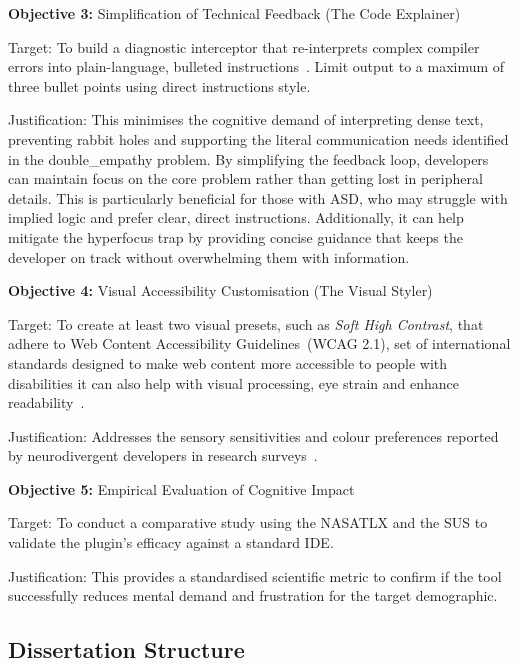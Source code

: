 \textbf{Objective 3:} Simplification of Technical Feedback (The Code Explainer)

Target: To build a diagnostic interceptor that re-interprets complex compiler errors into plain-language, bulleted instructions~\cite{rocha2025conceptual}. Limit output to a maximum of three bullet points using direct instructions style.


Justification: This minimises the cognitive demand of interpreting dense text, preventing rabbit holes and supporting the literal communication needs identified in the \Gls{double_empathy}
 problem. By simplifying the feedback loop, developers can maintain focus on the core problem rather than getting lost in peripheral details. This is particularly beneficial for those with \gls{ASD},
  who may struggle with implied logic and prefer clear, direct instructions. Additionally, it can help mitigate the \gls{hyperfocus} trap by providing concise guidance that keeps the developer on track 
  without overwhelming them with information.

\textbf{Objective 4: }Visual Accessibility Customisation (The Visual Styler)

Target: To create at least two visual presets, such as \textit{Soft High Contrast}, that adhere to Web Content Accessibility Guidelines~(\gls{WCAG} 2.1), set of international standards designed to make web content more accessible to people with disabilities it can also help with visual processing, eye strain and enhance readability~\cite{bengtsson2025web}.

Justification: Addresses the sensory sensitivities and colour preferences reported by \gls{neurodivergent} developers in research surveys~\cite{rocha2025conceptual}.

\textbf{Objective 5:} Empirical Evaluation of Cognitive Impact

Target: To conduct a comparative study using the \gls{NASATLX} and the \gls{SUS} to validate the plugin's efficacy against a standard \gls{IDE}.

Justification: This provides a standardised scientific metric to confirm if the tool successfully reduces mental demand and frustration for the target demographic.

\subsection{Dissertation Structure}

